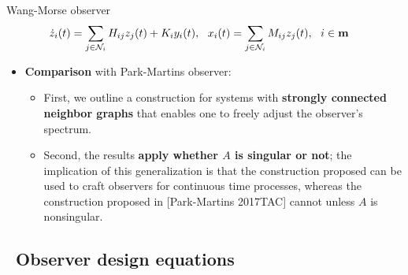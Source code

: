 \documentclass{beamer}
\begin{document}
\begin{frame}{\color{blue} }

Wang-Morse observer
\begin{align*}
\dot{z}_{i}(t)&=\sum_{j\in\mathcal{N}_{i}} H_{ij}z_{j}(t) + K_{i}y_{i}(t),~~ x_{i}(t)=\sum_{j\in\mathcal{N}_{i}} M_{ij}z_{j}(t),~~ i\in{\bf m}
\end{align*}

\begin{itemize}

  \item \textbf{Comparison} with Park-Martins observer:

\begin{itemize}
  \item First, we outline a construction for
systems with \textbf{strongly connected neighbor graphs} that enables
one to freely adjust the observer’s spectrum.

  \item Second, the results \textbf{apply whether $A$ is singular or not}; the implication
of this generalization is that the construction proposed
can be used to craft observers for continuous time processes,
whereas the construction proposed in [Park-Martins 2017TAC] cannot unless $A$ is nonsingular.
\end{itemize}
\end{itemize}
\end{frame}




\subsection{~Observer design equations}%
\end{document}
